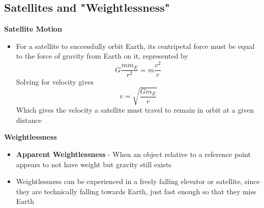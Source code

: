 \subsection{Satellites and "Weightlessness"}
\textbf{Satellite Motion}
\begin{itemize}
    \item For a satellite to successfully orbit Earth, its centripetal force must be equal to the force of gravity from Earth on it, represented by \[G\frac{mm_E}{r^2}=m\frac{v^2}{r}\] Solving for velocity gives \[v=\sqrt{\frac{Gm_E}{r}}\] Which gives the velocity a satellite must travel to remain in orbit at a given distance
\end{itemize}
\textbf{Weightlessness}
\begin{itemize}
    \item \textbf{Apparent Weightlessness} - When an object relative to a reference point appears to not have weight but gravity still exists
    \item Weightlessness can be experienced in a freely falling elevator or satellite, since they are technically falling towards Earth, just fast enough so that they miss Earth
\end{itemize}


